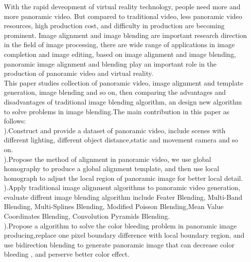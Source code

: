 \begin{eabstract}
    With the rapid deveopment of virtual reality technology, people need more and more panoramic video.
    But compared to traditional video, less panoramic video resources, high production cost, and difficulty
    in production are becoming prominent. Image alignment and image blending are important research direction in the field of image processing, there are wide range of applications in image completion and image editing, based on image alignment and image
    blending, panoramic image alignment and blending  play an important role in the production of panoramic video and virtual reality. \\
    \indent This paper studies collection of panoramic video, image alignment and template generation, image blending and so on,
    then comparing the advantages and disadvantages of traditional image blending algorithm, an design new algorithm to solve problems
    in image blending.The main contribution in this paper as follows:\\
    ).Construct and provide a dataset of panoramic video, include scenes with different lighting, different object distance,static and movement camera and so on.\\
    ).Propose the method of alignment in panoramic video, we use global homography to produce a global alignment template, 
    and then use local homograph to adjust the local region of panoramic image for better local detail.\\
    ).Apply traditional image alignment algorithms to panoramic video generation, evaluate diffrent image blending algorithm
    include Feater Blending, Multi-Band Blending, Multi-Splines Blending, Modified Poisson Blending,Mean Value Coordinates Blending,
    Convolution Pyramids Blending.\\
    ).Propose a algorithm to solve the color bleeding problem in panoramic image producing,replace one pixel boundary difference with local boundary region, and use bidirection blending to generate panoramic image that can decrease color bleeding , and perserve
    better color effect.\\

\end{eabstract}


